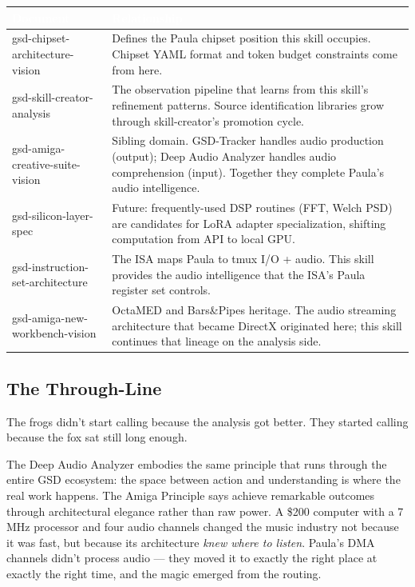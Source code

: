 \documentclass[11pt,letterpaper]{article}
\newcommand{\tableheader}[1]{\textbf{\sffamily\textcolor{white}{#1}}}
\begin{document}
\begin{center}
\begin{tabularx}{\textwidth}{L{4.5cm}X}
\toprule
{}
\tableheader{Document} & \tableheader{Relationship} \\
\midrule
gsd-chipset-architecture-vision & Defines the Paula chipset position this skill occupies. Chipset YAML format and token budget constraints come from here. \\
gsd-skill-creator-analysis & The observation pipeline that learns from this skill's refinement patterns. Source identification libraries grow through skill-creator's promotion cycle. \\
gsd-amiga-creative-suite-vision & Sibling domain. GSD-Tracker handles audio production (output); Deep Audio Analyzer handles audio comprehension (input). Together they complete Paula's audio intelligence. \\
gsd-silicon-layer-spec & Future: frequently-used DSP routines (FFT, Welch PSD) are candidates for LoRA adapter specialization, shifting computation from API to local GPU. \\
gsd-instruction-set-architecture & The ISA maps Paula to tmux I/O + audio. This skill provides the audio intelligence that the ISA's Paula register set controls. \\
gsd-amiga-new-workbench-vision & OctaMED and Bars\&Pipes heritage. The audio streaming architecture that became DirectX originated here; this skill continues that lineage on the analysis side. \\
\bottomrule
\end{tabularx}
\end{center}

\subsection{The Through-Line}

The frogs didn't start calling because the analysis got better. They started calling because the fox sat still long enough.

The Deep Audio Analyzer embodies the same principle that runs through the entire GSD ecosystem: the space between action and understanding is where the real work happens. The Amiga Principle says achieve remarkable outcomes through architectural elegance rather than raw power. A \$200 computer with a 7 MHz processor and four audio channels changed the music industry not because it was fast, but because its architecture \textit{knew where to listen}. Paula's DMA channels didn't process audio --- they moved it to exactly the right place at exactly the right time, and the magic emerged from the routing.
\end{document}
